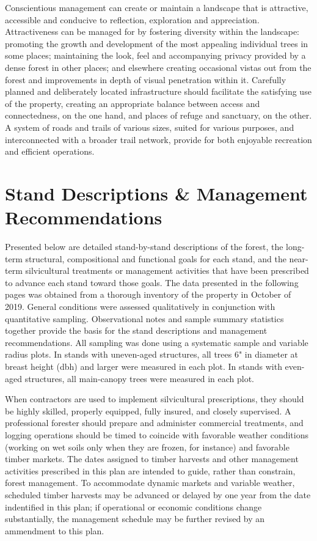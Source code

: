 \documentclass[]{tufte-handout}
\begin{document}
Conscientious management can create or maintain a landscape that is
attractive, accessible and conducive to reflection, exploration and
appreciation. Attractiveness can be managed for by fostering diversity
within the landscape: promoting the growth and development of the most
appealing individual trees in some places; maintaining the look, feel
and accompanying privacy provided by a dense forest in other places; and
elsewhere creating occasional vistas out from the forest and
improvements in depth of visual penetration within it. Carefully planned
and deliberately located infrastructure should facilitate the satisfying
use of the property, creating an appropriate balance between access and
connectedness, on the one hand, and places of refuge and sanctuary, on
the other. A system of roads and trails of various sizes, suited for
various purposes, and interconnected with a broader trail network,
provide for both enjoyable recreation and efficient operations.

\section{Stand Descriptions \& Management
Recommendations}\label{stand-descriptions-management-recommendations}

Presented below are detailed stand-by-stand descriptions of the forest,
the long-term structural, compositional and functional goals for each
stand, and the near-term silvicultural treatments or management
activities that have been prescribed to advance each stand toward those
goals. The data presented in the following pages was obtained from a
thorough inventory of the property in October of 2019. General
conditions were assessed qualitatively in conjunction with quantitative
sampling. Observational notes and sample summary statistics together
provide the basis for the stand descriptions and management
recommendations. All sampling was done using a systematic sample and
variable radius plots. In stands with uneven-aged structures, all trees
6" in diameter at breast height (dbh) and larger were measured in each
plot. In stands with even-aged structures, all main-canopy trees were
measured in each plot.

When contractors are used to implement silvicultural prescriptions, they
should be highly skilled, properly equipped, fully insured, and closely
supervised. A professional forester should prepare and administer
commercial treatments, and logging operations should be timed to
coincide with favorable weather conditions (working on wet soils only
when they are frozen, for instance) and favorable timber markets. The
dates assigned to timber harvests and other management activities
prescribed in this plan are intended to guide, rather than constrain,
forest management. To accommodate dynamic markets and variable weather,
scheduled timber harvests may be advanced or delayed by one year from
the date indentified in this plan; if operational or economic conditions
change substantially, the management schedule may be further revised by
an ammendment to this plan.
\end{document}
